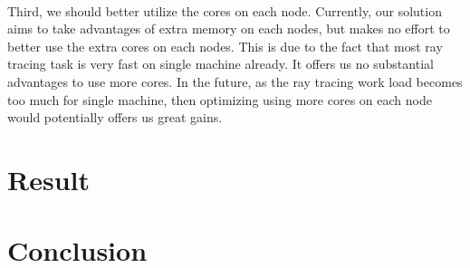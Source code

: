 \documentclass[a4paper, oneside, 10pt]{article}
\begin{document}
\paragraph{} Third, we should better utilize the cores on each node. Currently, our solution aims to take advantages of extra memory on each nodes, but makes no effort to better use the extra cores on each nodes. This is due to the fact that most ray tracing task is very fast on single machine already. It offers us no substantial advantages to use more cores.  In the future, as the ray tracing work load becomes too much for single machine, then optimizing using more cores on each node would potentially offers us great gains.

\section{Result}
\section{Conclusion}





\end{document}
